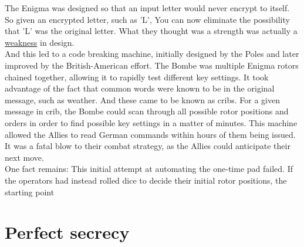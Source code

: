 \documentclass{report}
\begin{document}
The Enigma was designed so that an input letter would never encrypt to itself. So given an encrypted letter, such as  'L', You can now eliminate the possibility that 'L' was the original letter. What they thought was a strength was actually a \underline{weakness} in design. \\
And this led to a code breaking machine, initially designed by the Poles and later improved by the British-American effort. The Bombe was multiple Enigma rotors chained together, allowing it to rapidly test different key settings. It took advantage of the fact that common words were known to be in the original message, such as weather. And these came to be known as cribs. For a given message in crib, the Bombe could scan through all possible rotor positions and orders in order to find possible key settings in a matter of minutes. This machine allowed the Allies to read German commands within hours of them being issued. It was a fatal blow to their combat strategy, as the Allies could anticipate their next move. \\
One fact remains: This initial attempt at automating the one-time pad failed. If the operators had instead rolled dice to decide their initial rotor positions, the starting point 

\section{Perfect secrecy}
\end{document}
